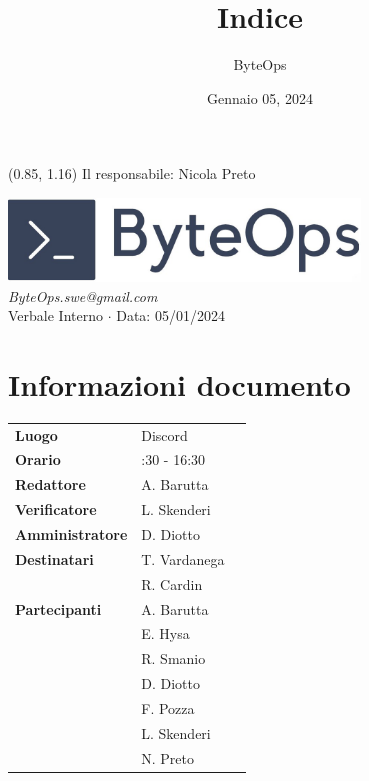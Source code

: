 \documentclass{article}
\title{\textbf{\fontsize{28}{6}\selectfont Indice}}
\author{\fontsize{14}{6}\selectfont ByteOps}
\date{Gennaio 05, 2024}
\begin{document}
\begin{textblock*}{\textwidth}(0.85\textwidth, 1.16\textheight)
    Il responsabile: Nicola Preto
\end{textblock*}

\pagestyle{fancy}
\begin{center}
\includegraphics[width = 0.7\textwidth]{../../../Images/logo.png} \\
\vspace{0.2cm}
\textcolor[RGB]{60, 60, 60}{\textit{ByteOps.swe@gmail.com}} \\
\vspace{1cm}
\fontsize{16}{6}\selectfont Verbale Interno $\cdot$ Data: 05/01/2024 \\
\vspace{0.5cm}
\end{center}

\section*{Informazioni documento}
\def\arraystretch{1.2}
\begin{tabular}{>{\raggedleft\arraybackslash}p{}|>{\raggedright\arraybackslash}p{}c}
    \hline
    \addlinespace
    \textbf{Luogo} & Discord \vspace{10pt} \\
    \textbf{Orario} & 14:30 - 16:30 \vspace{10pt} \\
    \textbf{Redattore} & A. Barutta \vspace{10pt} \\
    \textbf{Verificatore} & L. Skenderi \vspace{10pt} \\
    \textbf{Amministratore} & D. Diotto \vspace{10pt} \\
    \textbf{Destinatari} & T. Vardanega \\ & R. Cardin \vspace{10pt} \\
    \textbf{Partecipanti} & A. Barutta \\ & E. Hysa \\ & R. Smanio \\ & D. Diotto \\ & F. Pozza \\ & L. Skenderi \\ & N. Preto \vspace{10pt} \\
\end{tabular}
\pagebreak 
\end{document}
